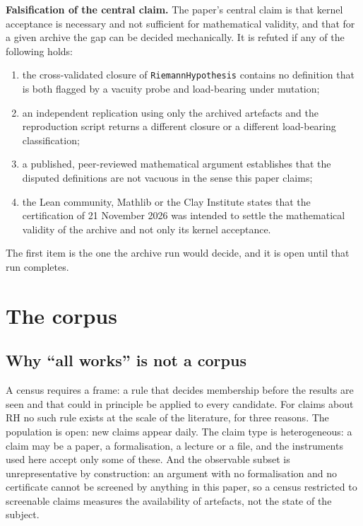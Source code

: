 \documentclass[11pt,a4paper]{article}
\newcommand{\RH}{\mathrm{RH}}
\begin{document}
\textbf{Falsification of the central claim.} The paper's central claim is that kernel acceptance is
necessary and not sufficient for mathematical validity, and that for a given archive the gap can be
decided mechanically. It is refuted if any of the following holds:
\begin{enumerate}
\item the cross-validated closure of \texttt{RiemannHypothesis} contains no definition that is both
  flagged by a vacuity probe and load-bearing under mutation;
\item an independent replication using only the archived artefacts and the reproduction script
  returns a different closure or a different load-bearing classification;
\item a published, peer-reviewed mathematical argument establishes that the disputed definitions are
  not vacuous in the sense this paper claims;
\item the Lean community, Mathlib or the Clay Institute states that the certification of
  21 November 2026 was intended to settle the mathematical validity of the archive and not only its
  kernel acceptance.
\end{enumerate}
The first item is the one the archive run would decide, and it is open until that run completes.

\section{The corpus}
\label{sec:corpus}

\subsection{Why ``all works'' is not a corpus}

A census requires a frame: a rule that decides membership before the results are seen and
that could in principle be applied to every candidate. For claims about $\RH$ no such rule exists
at the scale of the literature, for three reasons. The population is open: new claims appear
daily. The claim type is heterogeneous: a claim may be a paper, a formalisation, a lecture or a
file, and the instruments used here accept only some of these. And the observable subset is
unrepresentative by construction: an argument with no formalisation and no certificate cannot be
screened by anything in this paper, so a census restricted to screenable claims measures the
availability of artefacts, not the state of the subject.
\end{document}
